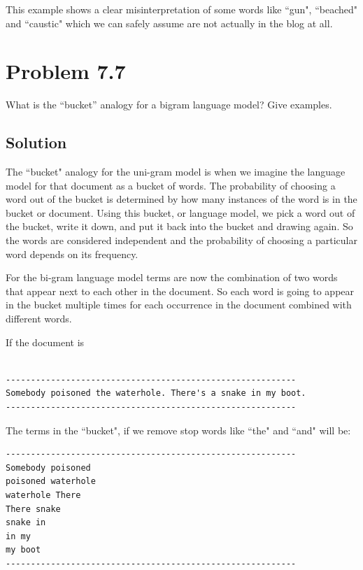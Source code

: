 \documentclass[letterpaper,12pt]{article}
\begin{document}
This example shows a clear misinterpretation of some words like ``gun", ``beached" and ``caustic" which we can safely assume are not actually in the blog at all.

\pagebreak

\section{Problem 7.7}

What is the ``bucket” analogy for a bigram language model? Give examples.

\subsection{Solution}

The ``bucket" analogy for the uni-gram model is when we imagine the language model for that document as a bucket of words. The probability of choosing a word out of the bucket is determined by how many instances of the word is in the bucket or document. Using this bucket, or language model, we pick a word out of the bucket, write it down, and put it back into the bucket and drawing again. So the words are considered independent and the probability of choosing a particular word depends on its frequency.

For the bi-gram language model terms are now the combination of two words that appear next to each other in the document. So each word is going to appear in the bucket multiple times for each occurrence in the document combined with different words.

If the document is

\begin{lstlisting}[breaklines]

----------------------------------------------------------
Somebody poisoned the waterhole. There's a snake in my boot.
----------------------------------------------------------
\end{lstlisting}

The terms in the ``bucket", if we remove stop words like ``the" and ``and" will be:

\begin{lstlisting}[breaklines]
----------------------------------------------------------
Somebody poisoned 
poisoned waterhole 
waterhole There 
There snake
snake in 
in my 
my boot
----------------------------------------------------------
\end{lstlisting}
\end{document}
